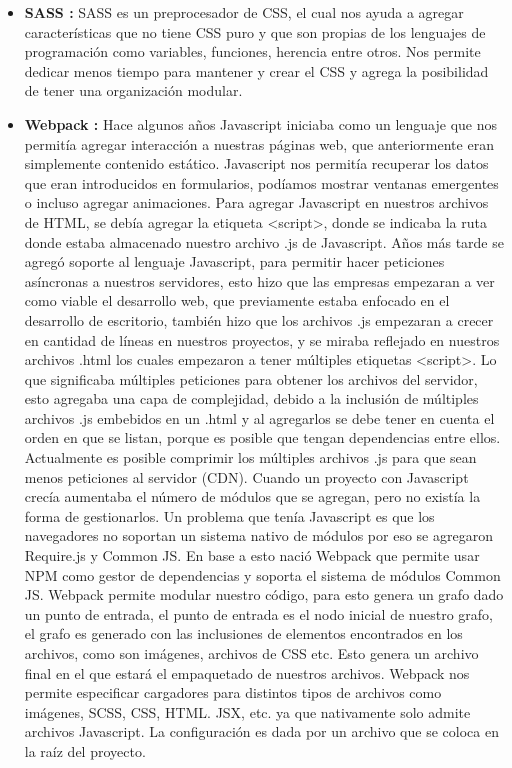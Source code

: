 \begin{itemize}
       \item \textbf{ SASS :} SASS \cite{scss} es un preprocesador de CSS, el cual nos ayuda a agregar características que no tiene CSS puro y que son propias de los lenguajes de programación como variables, funciones, herencia entre otros. Nos permite dedicar menos tiempo para mantener y crear el CSS y agrega la posibilidad de tener una organización modular. 
       
       \item \textbf{ Webpack :} Hace algunos años Javascript iniciaba como un lenguaje que nos permitía agregar interacción a nuestras páginas web, que anteriormente eran simplemente contenido estático.  Javascript nos permitía recuperar los datos que eran introducidos en formularios, podíamos mostrar ventanas emergentes o incluso agregar animaciones. Para agregar Javascript en nuestros archivos de HTML, se debía agregar la etiqueta <script>, donde se indicaba la ruta donde estaba almacenado nuestro archivo .js de Javascript.  
    Años más tarde se agregó soporte al lenguaje Javascript, para permitir hacer peticiones asíncronas a nuestros servidores, esto hizo que las empresas empezaran a ver como viable el desarrollo web, que previamente estaba enfocado en el desarrollo de escritorio, también hizo que los archivos .js empezaran a crecer en cantidad de líneas en nuestros proyectos, y se miraba reflejado en nuestros archivos .html los cuales empezaron a tener múltiples etiquetas <script>. Lo que significaba múltiples peticiones para obtener los archivos del servidor, esto agregaba una capa de complejidad, debido a la inclusión de múltiples archivos .js embebidos en un .html y al agregarlos se debe tener en cuenta el orden en que se listan, porque es posible que tengan dependencias entre ellos. Actualmente es posible comprimir los múltiples archivos .js para que sean menos peticiones al servidor (CDN).  Cuando un proyecto con Javascript crecía aumentaba el número de módulos que se agregan, pero no existía la forma de gestionarlos. Un problema que tenía Javascript es que los navegadores no soportan un sistema nativo de módulos por eso se agregaron Require.js y Common JS. 
    En base a esto nació Webpack \cite{webPack} que permite usar NPM como gestor de dependencias y soporta el sistema de módulos Common JS.
    Webpack permite modular nuestro código, para esto genera un grafo dado un punto de entrada, el punto de entrada es el nodo inicial de nuestro grafo, el grafo es generado con las inclusiones de elementos encontrados en los archivos, como son imágenes, archivos de CSS etc. Esto genera un archivo final en el que estará el empaquetado de nuestros archivos. 
    Webpack nos permite especificar cargadores para distintos tipos de archivos como imágenes, SCSS, CSS, HTML. JSX, etc. ya que nativamente solo admite archivos Javascript. 
    La configuración es dada por un archivo que se coloca en la raíz del proyecto.
    

\end{itemize}
